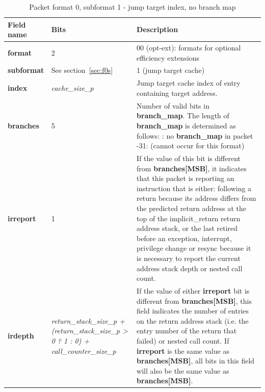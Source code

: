 \begin{table}[htp]
  \centering
  \caption{Packet format 0, subformat 1 - jump target index, no branch map}
  \label{tab:te_inst0-1-cache-nomap}
  \begin{tabulary}{\textwidth}{|l|p{35mm}|p{80mm}|}
    \hline
    {\bf Field name} & {\bf Bits} & {\bf Description} \\
    \hline
    \textbf{format}	& 2	& 00 (opt-ext): formats for optional efficiency extensions\\
    \hline
     \textbf{subformat}  & See section~\ref{sec:f0s} & 1 (jump target cache)\\
     \hline
    \textbf{index} & \textit {\textit{cache\_size\_p}} & 
              Jump target cache index of entry containing target address.\\ 
    \hline
    \textbf{branches} & 5 & Number of valid bits in \textbf{branch\_map}. The length of \textbf{branch\_map} is determined as follows: :    no \textbf{branch\_map} in packet -31: (cannot occur for this format) \\
    \hline
    \textbf{irreport}	& 1 & 
                If the value of this bit is different from \textbf{branches[MSB]}, it indicates that this packet is
                reporting an instruction that is either: \newline
                following a return because its address differs from the predicted return address at the top of 
                the implicit\_return return address stack, or \newline
                the last retired before an exception, interrupt, privilege change or resync because it is necessary to report 
                the current address stack depth or nested call count. \\
    \hline
    \textbf{irdepth}	& \textit {return\_stack\_size\_p + (return\_stack\_size\_p > 0 ? 1 : 0) + call\_counter\_size\_p} & 
                If the value of either \textbf{irreport} bit is different from \textbf{branches[MSB]}, this field 
				indicates the number of entries on the return address stack (i.e. the entry number of the return that
                failed) or nested call count.  If \textbf{irreport} is the same value as \textbf{branches[MSB]}, 
                all bits in this field  will also be the same value as \textbf{branches[MSB]}. \\
    \hline
  \end{tabulary}
\end{table}

